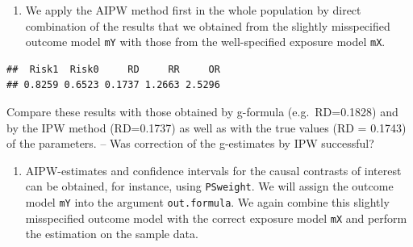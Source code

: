 \documentclass[
]{book}
\newenvironment{Shaded}{\begin{snugshade}}{\end{snugshade}}
\newcommand{\DecValTok}[1]{\textcolor[rgb]{0.00,0.00,0.81}{#1}}
\newcommand{\FunctionTok}[1]{\textcolor[rgb]{0.13,0.29,0.53}{\textbf{#1}}}
\newcommand{\NormalTok}[1]{#1}
\newcommand{\OtherTok}[1]{\textcolor[rgb]{0.56,0.35,0.01}{#1}}
\newcommand{\SpecialCharTok}[1]{\textcolor[rgb]{0.81,0.36,0.00}{\textbf{#1}}}
\providecommand{\tightlist}{%
  \setlength{\itemsep}{0pt}\setlength{\parskip}{0pt}}
\theoremstyle{definition}
\theoremstyle{definition}
\theoremstyle{definition}
\theoremstyle{definition}
\theoremstyle{remark}
\begin{document}
\begin{enumerate}
\def\labelenumi{\arabic{enumi}.}
\tightlist
\item
  We apply the AIPW method first in the whole population by direct
  combination of the results that we obtained from the slightly
  misspecified outcome model \texttt{mY} with those from the well-specified
  exposure model \texttt{mX}.
\end{enumerate}

\begin{Shaded}
\end{Shaded}

\begin{verbatim}
##  Risk1  Risk0     RD     RR     OR 
## 0.8259 0.6523 0.1737 1.2663 2.5296
\end{verbatim}

Compare these results with those obtained by g-formula (e.g.~RD=0.1828)
and by the IPW method (RD=0.1737) as well as with the true values (RD =
0.1743) of the parameters. -- Was correction of the g-estimates by IPW
successful?

\begin{enumerate}
\def\labelenumi{\arabic{enumi}.}
\setcounter{enumi}{1}
\tightlist
\item
  AIPW-estimates and confidence intervals for the causal contrasts of
  interest can be obtained, for instance, using \texttt{PSweight}. We will
  assign the outcome model \texttt{mY} into the argument \texttt{out.formula}. We
  again combine this slightly misspecified outcome model with the
  correct exposure model \texttt{mX} and perform the estimation on the sample
  data.
\end{enumerate}
\end{document}
